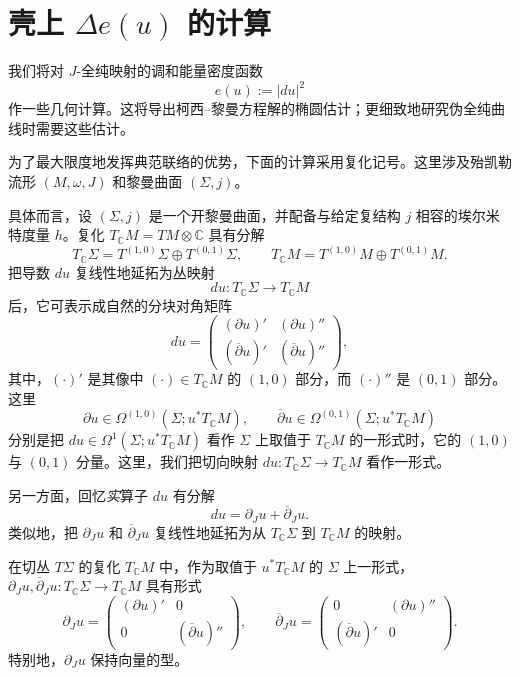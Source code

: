 \section{壳上 \texorpdfstring{$\Delta e(u)$}{Delta e(u)} 的计算}
\label{sec:calculations-delta-energy-on-shell}

我们将对 $J$-全纯映射的调和能量密度函数
\[
 e(u):=|du|^2
\]
作一些几何计算。这将导出柯西--黎曼方程解的椭圆估计；更细致地研究伪全纯曲线时需要这些估计。

为了最大限度地发挥典范联络的优势，下面的计算采用复化记号。这里涉及殆凯勒流形 $(M,\omega,J)$ 和黎曼曲面 $(\Sigma,j)$。

具体而言，设 $(\Sigma,j)$ 是一个开黎曼曲面，并配备与给定复结构 $j$ 相容的埃尔米特度量 $h$。复化 $T_{\mathbb C}M=TM\otimes\mathbb C$ 具有分解
\begin{equation}
 T_{\mathbb C}\Sigma=T^{(1,0)}\Sigma\oplus T^{(0,1)}\Sigma,
 \qquad
 T_{\mathbb C}M=T^{(1,0)}M\oplus T^{(0,1)}M.
 \label{eq:complexified-tangent-decompositions}
\end{equation}
把导数 $du$ 复线性地延拓为丛映射
\[
 du:T_{\mathbb C}\Sigma\longrightarrow T_{\mathbb C}M
\]
后，它可表示成自然的分块对角矩阵
\begin{equation}
 du=
 \begin{pmatrix}
  (\partial u)'&(\partial u)''\\
  (\overline\partial u)'&(\overline\partial u)''
 \end{pmatrix},
 \label{eq:du-complex-block-matrix}
\end{equation}
其中，$(\cdot)'$ 是其像中 $(\cdot)\in T_{\mathbb C}M$ 的 $(1,0)$ 部分，而 $(\cdot)''$ 是 $(0,1)$ 部分。这里
\begin{equation}
 \partial u\in\Omega^{(1,0)}(\Sigma;u^*T_{\mathbb C}M),
 \qquad
 \overline\partial u\in\Omega^{(0,1)}(\Sigma;u^*T_{\mathbb C}M)
 \label{eq:partial-u-form-types}
\end{equation}
分别是把 $du\in\Omega^1(\Sigma;u^*T_{\mathbb C}M)$ 看作 $\Sigma$ 上取值于 $T_{\mathbb C}M$ 的一形式时，它的 $(1,0)$ 与 $(0,1)$ 分量。这里，我们把切向映射 $du:T_{\mathbb C}\Sigma\to T_{\mathbb C}M$ 看作一形式。

另一方面，回忆\emph{实}算子 $du$ 有分解
\[
 du=\partial_Ju+\overline\partial_Ju.
\]
类似地，把 $\partial_Ju$ 和 $\overline\partial_Ju$ 复线性地延拓为从 $T_{\mathbb C}\Sigma$ 到 $T_{\mathbb C}M$ 的映射。

\begin{lemma}\label{lem:j-partial-complex-block-forms}
在切丛 $T\Sigma$ 的复化 $T_{\mathbb C}M$ 中，作为取值于 $u^*T_{\mathbb C}M$ 的 $\Sigma$ 上一形式，
$\partial_Ju,\overline\partial_Ju:T_{\mathbb C}\Sigma\to T_{\mathbb C}M$ 具有形式
\[
 \partial_Ju=
 \begin{pmatrix}(\partial u)'&0\\0&(\overline\partial u)''\end{pmatrix},
 \qquad
 \overline\partial_Ju=
 \begin{pmatrix}0&(\partial u)''\\(\overline\partial u)'&0\end{pmatrix}.
\]
特别地，$\partial_Ju$ 保持向量的型。
\end{lemma}

